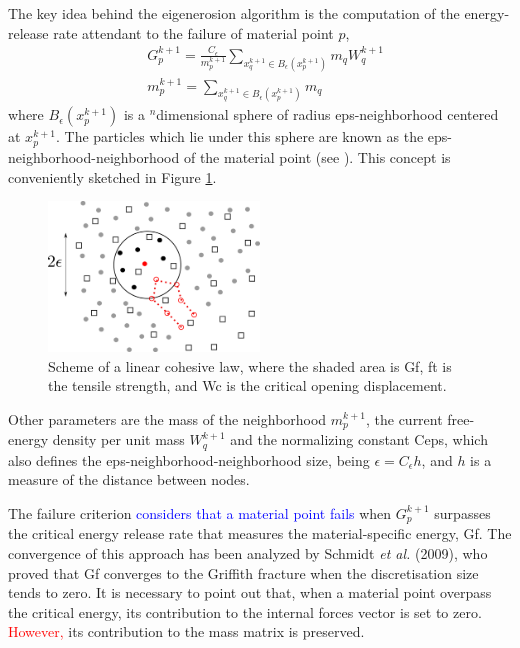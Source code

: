 \documentclass[preprint,12pt,a4paper]{elsarticle}
\begin{document}
The key idea behind the eigenerosion algorithm is the computation of the
energy-release rate attendant to the failure of material point $p$,
\begin{align}
  \label{eq:energy-release-EE}
&G_p^{k+1} = \frac{C_{\epsilon}}{m_p^{k+1}}  \sum_{x_q^{k+1} \in
  B_{\epsilon}(x_p^{k+1})} m_q W_q^{k+1}\\
  \label{eq:mass-EE}
&m_p^{k+1} =  \sum_{x_q^{k+1} \in
  B_{\epsilon}(x_p^{k+1})} m_q  
\end{align}
where $B_{\epsilon}(x_p^{k+1})$ is a $^n$dimensional sphere of radius \gls{eps-neighborhood}
centered at $x_p^{k+1}$. The particles which lie under this sphere are
known as the \gls{eps-neighborhood}-neighborhood of the material point (see
\cite{Pandolfi_2012}). This concept is conveniently sketched in
Figure \ref{fig:Failed-particles}.
\begin{figure}
  \centering
  \includegraphics[width=0.5\textwidth]{Figure-Particle-failed}
  \caption{Scheme of a linear cohesive law, where the shaded area is
    \gls{Gf}, \gls{ft} is the tensile strength, and \gls{Wc} is the critical
    opening displacement.}
  \label{fig:Failed-particles}
\end{figure}
Other parameters are the mass of the neighborhood $m_p^{k+1}$, the
current free-energy density per unit mass  $W_q^{k+1}$ and the
normalizing constant \gls{Ceps}, which also defines the \gls{eps-neighborhood}-neighborhood size, being $\epsilon = C_\epsilon h$, and $h$ is a measure of the distance between nodes.

The failure criterion \textcolor{blue}{considers that a material point fails}
when $G_p^{k+1}$ surpasses the critical energy release rate that
measures the material-specific energy, \gls{Gf}. The convergence of this
approach has been analyzed by Schmidt {\it et al.}
(2009)\cite{Schmidt_2009}, who proved that \gls{Gf} converges to the Griffith
fracture when the discretisation size tends to zero. It is necessary to
point out that, when a material point overpass the critical energy, its
contribution to the internal forces vector is set to zero. \textcolor{red}{However,} its
contribution to the mass matrix is preserved.\\
\end{document}
